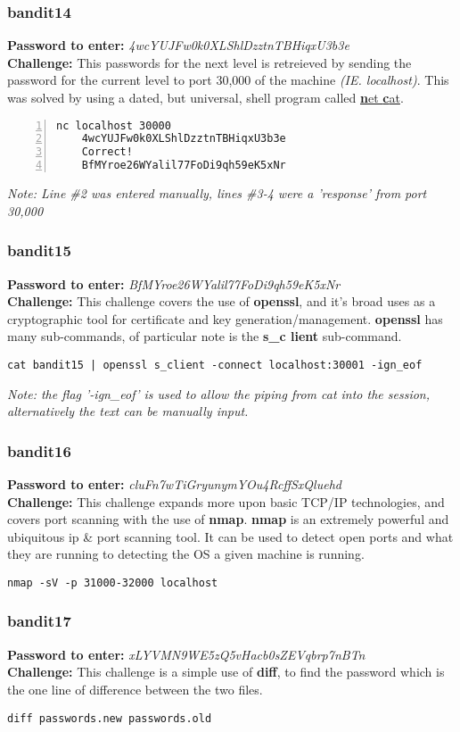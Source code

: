 \documentclass[a4paper]{article}
\newcommand{\pass}[1]{\textbf{Password to enter:} \textit{#1}\\}
\newcommand{\chall}{\textbf{Challenge:} }
\begin{document}
\subsubsection{bandit14}
\pass{4wcYUJFw0k0XLShlDzztnTBHiqxU3b3e}
\chall This passwords for the next level is retreieved by sending the password for the current level to port 30,000 of the machine \textit{(IE. localhost)}. This was solved by using a dated, but universal, shell program called \href{https://en.wikipedia.org/wiki/Netcat}{\textbf{n}et \textbf{c}at}.
\begin{lstlisting}[numbers=left]
nc localhost 30000
	4wcYUJFw0k0XLShlDzztnTBHiqxU3b3e
	Correct!
	BfMYroe26WYalil77FoDi9qh59eK5xNr
\end{lstlisting}
\textit{Note: Line \#2 was entered manually, lines \#3-4 were a 'response' from port 30,000}

\subsubsection{bandit15}
\pass{BfMYroe26WYalil77FoDi9qh59eK5xNr}
\chall This challenge covers the use of \textbf{openssl}, and it's broad uses as a cryptographic tool for certificate and key generation/management. \textbf{openssl} has many sub-commands, of particular note is the \textbf{s\_c lient} sub-command.
\begin{lstlisting}
cat bandit15 | openssl s_client -connect localhost:30001 -ign_eof
\end{lstlisting}
\textit{Note: the flag '-ign\_eof' is used to allow the piping from cat into the session, alternatively the text can be manually input.}

\subsubsection{bandit16}
\pass{cluFn7wTiGryunymYOu4RcffSxQluehd}
\chall This challenge expands more upon basic TCP/IP technologies, and covers port scanning with the use of \textbf{nmap}. \textbf{nmap} is an extremely powerful and ubiquitous ip \& port scanning tool. It can be used to detect open ports and what they are running to detecting the OS a given machine is running.\begin{lstlisting}[title=scan ports 31000 32000 of localhost and attempt to discover what they are running]
nmap -sV -p 31000-32000 localhost
\end{lstlisting}

\subsubsection{bandit17}
\pass{xLYVMN9WE5zQ5vHacb0sZEVqbrp7nBTn}
\chall This challenge is a simple use of \textbf{diff}, to find the password which is the one line of difference between the two files.
\begin{lstlisting}
diff passwords.new passwords.old
\end{lstlisting}
\end{document}
